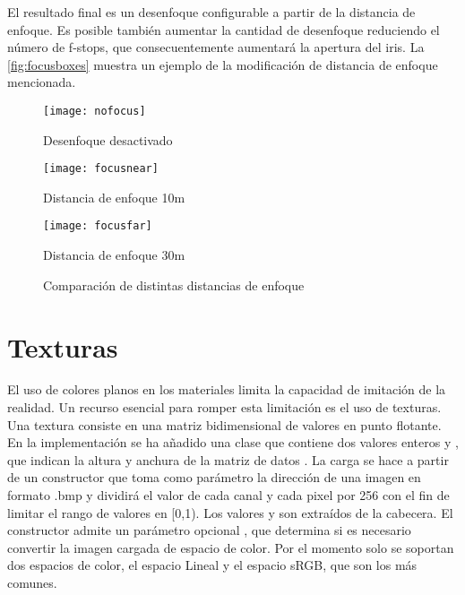 El resultado final es un desenfoque configurable a partir de la distancia de enfoque. Es posible también aumentar la cantidad de desenfoque reduciendo el número de f-stops, que consecuentemente aumentará la apertura del iris. La \autoref{fig:focusboxes} muestra un ejemplo de la modificación de distancia de enfoque mencionada.

\begin{figure}[H]
	\centering
  \begin{minipage}[b]{0.3\textwidth}
	\texttt{[image: nofocus]}
	\caption{Desenfoque desactivado}
  \end{minipage}
  \hfill
  \begin{minipage}[b]{0.3\textwidth}
	\texttt{[image: focusnear]}
	\caption{Distancia de enfoque 10m}
  \end{minipage}
  	\hfill
  \begin{minipage}[b]{0.3\textwidth}
	\texttt{[image: focusfar]}
	\caption{Distancia de enfoque 30m}
  \end{minipage}
\caption{Comparación de distintas distancias de enfoque}
\label{fig:focusboxes}
\end{figure}
	
		
\section{Texturas}
	
El uso de colores planos en los materiales limita la capacidad de imitación de la realidad. Un recurso esencial para romper esta limitación es el uso de texturas. Una textura consiste en una matriz bidimensional de valores en punto flotante. En la implementación se ha añadido una clase  que contiene dos valores enteros  y , que indican la altura y anchura de la matriz de datos . La carga se hace a partir de un constructor que toma como parámetro la dirección de una imagen en formato .bmp y dividirá el valor de cada canal y cada pixel por 256 con el fin de limitar el rango de valores en [0,1). Los valores  y  son extraídos de la cabecera. El constructor admite un parámetro opcional , que determina si es necesario convertir la imagen cargada de espacio de color. Por el momento solo se soportan dos espacios de color, el espacio Lineal y el espacio sRGB, que son los más comunes.
	
	
